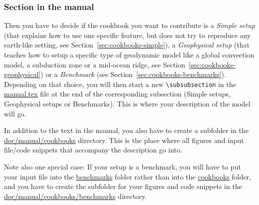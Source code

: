 \documentclass{article}
\begin{document}
\subsubsection{Section in the manual}

Then you have to decide if the cookbook you want to contribute is a \textit{Simple setup}
(that explains how to use one specific feature, but does not try to reproduce any
earth-like setting, see Section~\ref{sec:cookbooks-simple}), a \textit{Geophysical setup}
(that teaches how to setup a specific type of geodynamic model like a global convection model,
a subduction zone or a mid-ocean ridge, see Section~\ref{sec:cookbooks-geophysical})
or a \textit{Benchmark} (see Section~\ref{sec:cookbooks-benchmarks}).
Depending on that choice, you will then start a new \verb!\subsubsection! in the
\href{doc/manual/manual.tex}{manual.tex} file at the end of the
corresponding subsection (Simple setups, Geophysical setups or Benchmarks). This is where
your description of the model will go.

In addition to the text in the manual, you also have to create a subfolder
in the \href{doc/manual/cookbooks/.}{doc/manual/cookbooks} directory.
This is the place where all figures and input file/code snippets that accompany the description
go into.

Note also one special case: If your setup is a benchmark, you will have to put your input file into the
\href{benchmarks/.}{benchmarks} folder rather than into the \href{cookbooks/.}{cookbooks} folder,
and you have to create the subfolder for your figures and code snippets in the
\href{doc/manual/cookbooks/benchmarks/.}{doc/manual/cookbooks/benchmarks} directory.
\end{document}

